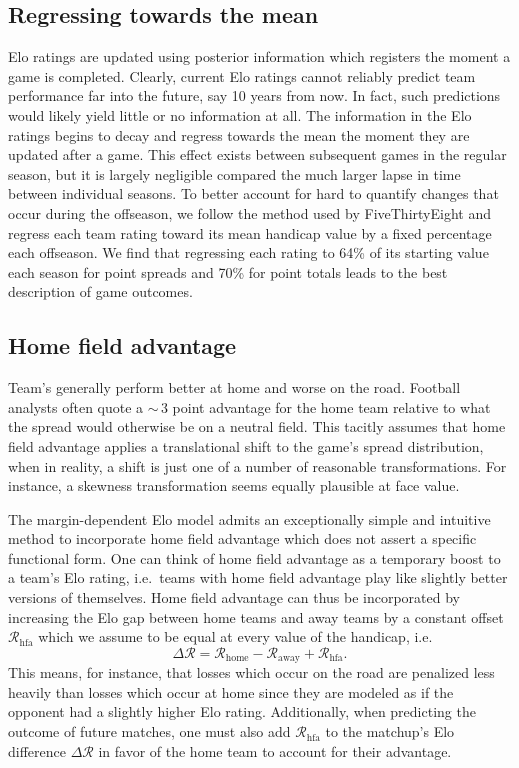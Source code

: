\documentclass[aps,prc,reprint,amsmath,superscriptaddress]{revtex4-1}
\begin{document}
\subsection{Regressing towards the mean}

Elo ratings are updated using posterior information which registers the moment a game is completed.
Clearly, current Elo ratings cannot reliably predict team performance far into the future, say 10 years from now.
In fact, such predictions would likely yield little or no information at all.
The information in the Elo ratings begins to decay and regress towards the mean the moment they are updated after a game.
This effect exists between subsequent games in the regular season, but it is largely negligible compared the much larger lapse in time between individual seasons.
To better account for hard to quantify changes that occur during the offseason, we follow the method used by FiveThirtyEight and regress each team rating toward its mean handicap value by a fixed percentage each offseason.
We find that regressing each rating to 64\% of its starting value each season for point spreads and 70\% for point totals leads to the best description of game outcomes.

\subsection{Home field advantage}

Team's generally perform better at home and worse on the road.
Football analysts often quote a ${\sim}\,3$ point advantage for the home team relative to what the spread would otherwise be on a neutral field. 
This tacitly assumes that home field advantage applies a translational shift to the game's spread distribution, when in reality, a shift is just one of a number of reasonable transformations.
For instance, a skewness transformation seems equally plausible at face value.

The margin-dependent Elo model admits an exceptionally simple and intuitive method to incorporate home field advantage which does not assert a specific functional form.
One can think of home field advantage as a temporary boost to a team's Elo rating, i.e.\ teams with home field advantage play like slightly better versions of themselves.  
Home field advantage can thus be incorporated by increasing the Elo gap between home teams and away teams by a constant offset $\mathcal{R}_\text{hfa}$ which we assume to be equal at every value of the handicap, i.e.\
\begin{equation}
  \Delta \mathcal{R} = \mathcal{R}_\text{home} - \mathcal{R}_\text{away} + \mathcal{R}_\text{hfa}.
\end{equation}
This means, for instance, that losses which occur on the road are penalized less heavily than losses which occur at home since they are modeled as if the opponent had a slightly higher Elo rating.
Additionally, when predicting the outcome of future matches, one must also add $\mathcal{R}_\text{hfa}$ to the matchup's Elo difference $\Delta \mathcal{R}$ in favor of the home team to account for their advantage.
\end{document}
